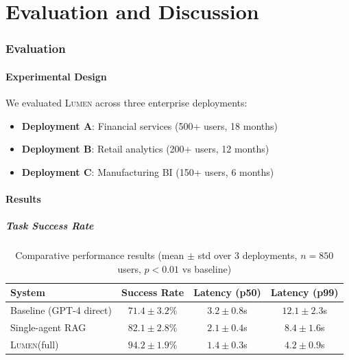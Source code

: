 \documentclass[11pt,a4paper]{article}
\theoremstyle{definition}
\theoremstyle{remark}
\newcommand{\lumen}{\textsc{Lumen}\xspace}
\begin{document}

\part{Evaluation and Discussion}

\section{Evaluation}
\label{sec:evaluation}

\subsection{Experimental Design}

We evaluated \lumen across three enterprise deployments:

\begin{itemize}
    \item \textbf{Deployment A}: Financial services (500+ users, 18 months)
    \item \textbf{Deployment B}: Retail analytics (200+ users, 12 months)
    \item \textbf{Deployment C}: Manufacturing BI (150+ users, 6 months)
\end{itemize}

\subsection{Results}

\subsubsection{Task Success Rate}

\begin{table}[H]
\centering
\begin{tabular}{lccc}
\toprule
\textbf{System} & \textbf{Success Rate} & \textbf{Latency (p50)} & \textbf{Latency (p99)} \\
\midrule
Baseline (GPT-4 direct) & $71.4 \pm 3.2\%$ & $3.2 \pm 0.8$s & $12.1 \pm 2.3$s \\
Single-agent RAG & $82.1 \pm 2.8\%$ & $2.1 \pm 0.4$s & $8.4 \pm 1.6$s \\
\lumen (full) & $\mathbf{94.2 \pm 1.9\%}$ & $\mathbf{1.4 \pm 0.3}$s & $\mathbf{4.2 \pm 0.9}$s \\
\bottomrule
\end{tabular}
\caption{Comparative performance results (mean $\pm$ std over 3 deployments, $n=850$ users, $p < 0.01$ vs baseline)}
\label{tab:results}
\end{table}
\end{document}
